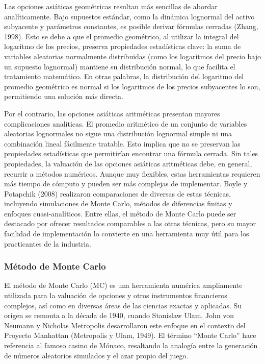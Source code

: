 \documentclass[11pt,a4paper,spanish]{article}
\numberwithin{equation}{section} %
\begin{document}
Las opciones asiáticas geométricas resultan más sencillas de abordar analíticamente. Bajo supuestos estándar, como la dinámica lognormal del activo subyacente y parámetros constantes, es posible derivar fórmulas cerradas (Zhang, 1998). Esto se debe a que el promedio geométrico, al utilizar la integral del logaritmo de los precios, preserva propiedades estadísticas clave: la suma de variables aleatorias normalmente distribuidas (como los logaritmos del precio bajo un supuesto lognormal) mantiene su distribución normal, lo que facilita el tratamiento matemático. En otras palabras, la distribución del logaritmo del promedio geométrico es normal si los logaritmos de los precios subyacentes lo son, permitiendo una solución más directa.

Por el contrario, las opciones asiáticas aritméticas presentan mayores complicaciones analíticas. El promedio aritmético de un conjunto de variables aleatorias lognormales no sigue una distribución lognormal simple ni una combinación lineal fácilmente tratable. Esto implica que no se preservan las propiedades estadísticas que permitirían encontrar una fórmula cerrada. Sin tales propiedades, la valuación de las opciones asiáticas aritméticas debe, en general, recurrir a métodos numéricos. Aunque muy flexibles, estas herramientas requieren más tiempo de cómputo y pueden ser más complejas de implementar. Boyle y Potapchik (2008) realizaron comparaciones de diversas de estas técnicas, incluyendo simulaciones de Monte Carlo, métodos de diferencias finitas y enfoques cuasi-analíticos. Entre ellas, el método de Monte Carlo puede ser destacado por ofrecer resultados comparables a las otras técnicas, pero su mayor facilidad de implementación lo convierte en una herramienta muy útil para los practicantes de la industria.


\subsubsection{Método de Monte Carlo}\label{subsubsec:metodo-monte-carlo}

El método de Monte Carlo (MC) es una herramienta numérica ampliamente utilizada para la valuación de opciones y otros instrumentos financieros complejos, así como en diversas áreas de las ciencias exactas y aplicadas. Su origen se remonta a la década de 1940, cuando Stanislaw Ulam, John von Neumann y Nicholas Metropolis desarrollaron este enfoque en el contexto del Proyecto Manhattan (Metropolis y Ulam, 1949). El término “Monte Carlo” hace referencia al famoso casino de Mónaco, resaltando la analogía entre la generación de números aleatorios simulados y el azar propio del juego.
\end{document}
